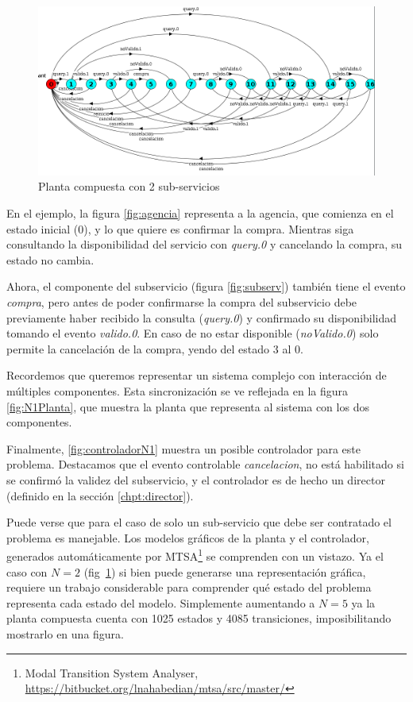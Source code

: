 \begin{figure}[htb]
	\includegraphics[width=\linewidth]{figures/ejemploServicios/N2Planta.png}  
	\caption{Planta compuesta con 2 sub-servicios}
	\label{fig:N2}
\end{figure}

En el ejemplo, la figura \ref{fig:agencia} representa a la agencia, que comienza en el estado inicial (0), y lo que quiere es confirmar la compra. Mientras siga consultando la disponibilidad del servicio con \textit{query.0} y cancelando la compra, su estado no cambia. 

Ahora, el componente del subservicio (figura \ref{fig:subserv}) también tiene el evento \textit{compra}, pero antes de poder confirmarse la compra del subservicio debe previamente haber recibido la consulta (\textit{query.0}) y confirmado su disponibilidad tomando el evento \textit{valido.0}. En caso de no estar disponible (\textit{noValido.0}) solo permite la cancelación de la compra, yendo del estado 3 al 0.

Recordemos que queremos representar un sistema complejo con interacción de múltiples componentes. Esta sincronización se ve reflejada en la figura \ref{fig:N1Planta}, que muestra la planta que representa al sistema con los dos componentes. 

Finalmente, \ref{fig:controladorN1} muestra un posible controlador para este problema. Destacamos que el evento controlable \textit{cancelacion}, no está habilitado si se confirmó la validez del subservicio, y el controlador es de hecho un director (definido en la sección \ref{chpt:director}). 

Puede verse que para el caso de solo un sub-servicio que debe ser contratado el problema es manejable. Los modelos gráficos de la planta y el controlador, generados automáticamente por MTSA\footnote{Modal Transition System Analyser, \href{https://bitbucket.org/lnahabedian/mtsa/src/master/^}{https://bitbucket.org/lnahabedian/mtsa/src/master/}} se comprenden con un vistazo. Ya el caso con $N=2$ (fig~\ref{fig:N2}) si bien puede generarse una representación gráfica, requiere un trabajo considerable para comprender qué estado del problema representa cada estado del modelo. Simplemente aumentando a $N=5$ ya la planta compuesta cuenta con 1025 estados y 4085 transiciones, imposibilitando mostrarlo en una figura. 

